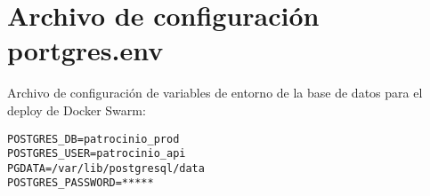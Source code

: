 \section{Archivo de configuración \textbf{portgres.env}}\label{sec:anexo:configfile-portgres-env}
Archivo de configuración de variables de entorno de la base de datos para el deploy de Docker Swarm:

\begin{lstlisting}[caption={Archivo de configuración portgres.env}, label={cod:portgres.env}, captionpos=b]
POSTGRES_DB=patrocinio_prod
POSTGRES_USER=patrocinio_api
PGDATA=/var/lib/postgresql/data
POSTGRES_PASSWORD=*****

\end{lstlisting}